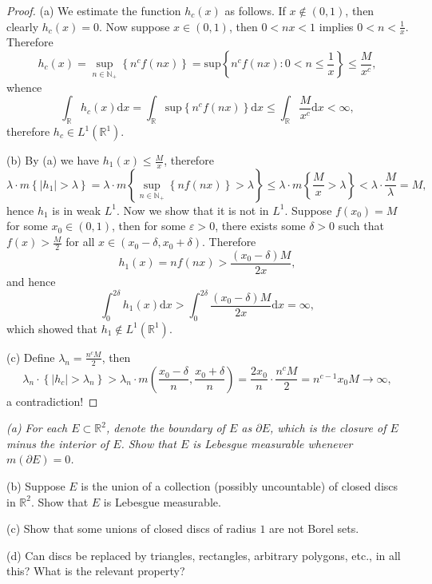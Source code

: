 \begin{proof}
(a) We estimate the function $h_c(x)$ as follows. If $x\notin(0,1)$, then clearly $h_c(x)=0$. Now suppose $x\in (0,1)$, then $0<nx<1$ implies $0<n<\frac{1}{x}$. Therefore 
$$
h_c\left( x \right) =\mathop {\mathrm{sup}} \limits_{n\in \mathbb{N} _+}\left\{ n^cf\left( nx \right) \right\} =\mathrm{sup}\left\{ n^cf\left( nx \right) :0<n\le \frac{1}{x} \right\} \le \frac{M}{x^c},
$$
whence 
$$
\int_{\mathbb{R}}{h_c\left( x \right) \mathrm{d}x}=\int_{\mathbb{R}}{\mathrm{sup}\left\{ n^cf\left( nx \right) \right\} \mathrm{d}x}\le \int_{\mathbb{R}}{\frac{M}{x^c}\mathrm{d}x}<\infty ,
$$
therefore $h_c\in L^1(\mathbb{R}^1)$.\par
(b) By (a) we have $h_1(x)\le\frac{M}{x}$, therefore 
$$
\lambda \cdot m\left\{ \left| h_1 \right|>\lambda \right\} =\lambda \cdot m\left\{ \mathop {\mathrm{sup}} \limits_{n\in \mathbb{N} _+}\left\{ nf\left( nx \right) \right\} >\lambda \right\} \le \lambda \cdot m\left\{ \frac{M}{x}>\lambda \right\} <\lambda \cdot \frac{M}{\lambda}=M,
$$
hence $h_1$ is in weak $L^1$. Now we show that it is not in $L^1$. Suppose $f(x_0)=M$ for some $x_0\in(0,1)$, then for some $\varepsilon>0$, there exists some $\delta>0$ such that $f(x)>\frac{M}{2}$ for all $x\in (x_0-\delta,x_0+\delta)$. Therefore 
$$
h_1\left( x \right) =nf\left( nx \right) >\frac{\left( x_0-\delta \right) M}{2x},
$$
and hence 
$$
\int_0^{2\delta}{h_1\left( x \right) \mathrm{d}x}>\int_0^{2\delta}{\frac{\left( x_0-\delta \right) M}{2x}\mathrm{d}x}=\infty ,
$$
which showed that $h_1\notin L^1(\mathbb{R}^1)$.\par
(c) Define $\lambda _n=\frac{n^cM}{2}$, then 
$$
\lambda _n\cdot \left\{ \left| h_c \right|>\lambda _n \right\} >\lambda _n\cdot m\left( \frac{x_0-\delta}{n},\frac{x_0+\delta}{n} \right) =\frac{2x_0}{n}\cdot \frac{n^cM}{2}=n^{c-1}x_0M\rightarrow \infty ,
$$
a contradiction!
\end{proof}
\begin{problem}\em
(a) For each $E\subset\mathbb{R}^2$, denote the boundary of $E$ as $\partial E$, which is the closure of $E$ minus the interior of $E$. Show that $E$ is Lebesgue measurable whenever $m(\partial E)=0$.\par
(b) Suppose $E$ is the union of a collection (possibly uncountable) of closed discs in $\mathbb{R}^2$. Show that $E$ is Lebesgue measurable.\par
(c) Show that some unions of closed discs of radius $1$ are not Borel sets.\par
(d) Can discs be replaced by triangles, rectangles, arbitrary polygons, etc., in all this? What is the relevant property?
\end{problem}
